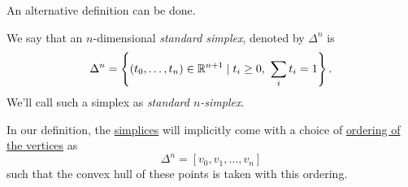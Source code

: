 An alternative definition can be done.
\begin{definition}\label{def:standard-simplex}
	We say that an \(n\)-dimensional \emph{standard simplex}, denoted by \(\Delta^n\) is
	\[
		\Delta^n = \left\{(t_0, \ldots , t_{n}) \in \mathbb{\MakeUppercase{r}}^{n+1} \mid t_i \geq 0,\ \sum\limits_{i}t_{i}  = 1 \right\}.
	\]
	We'll call such a simplex as \emph{standard \(n\)-simplex}.
	\begin{figure}[H]
		\centering
		\label{fig:def:standard-simplex}
	\end{figure}
\end{definition}
\begin{remark}
	In our definition, the \hyperref[def:standard-simplex]{simplices} will implicitly come with a choice of \underline{ordering of the vertices} as
	\[
		\Delta ^n = [v_0, v_1, \ldots , v_n ]
	\]
	such that the convex hull of these points is taken with this ordering.
\end{remark}